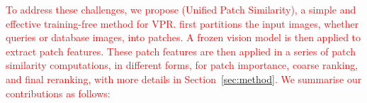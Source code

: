 
\textcolor{red}{To address these challenges, we propose \method{} (Unified Patch Similarity), a simple and effective training-free method for VPR. \method{} first partitions the input images, whether queries or database images, into patches. A frozen vision model is then applied to extract patch features. These patch features are then applied in a series of patch similarity computations, in different forms, for patch importance, coarse ranking, and final reranking, with more details in Section~\ref{sec:method}. We summarise our contributions as follows:}

